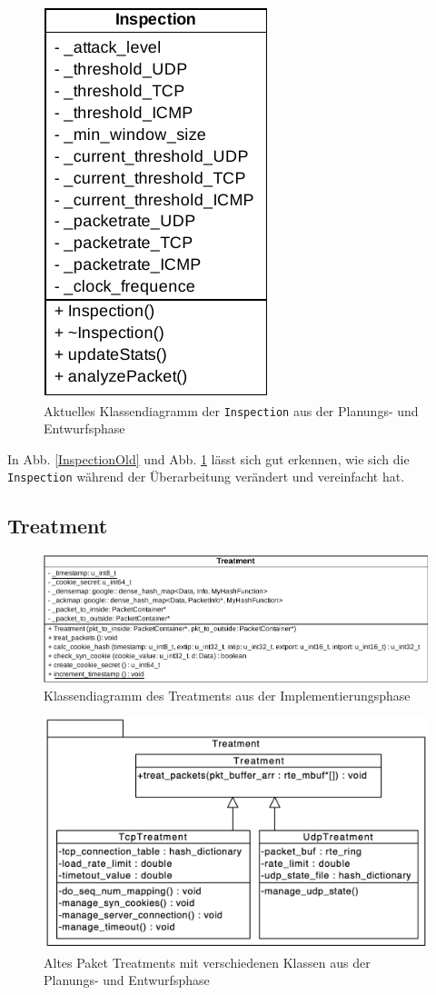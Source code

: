 \documentclass[../review_3.tex]{subfiles}
\begin{document}
\begin{figure}[h]
    \centering
    \includegraphics[width=.3\linewidth]{img/Inspection.pdf}
    \caption{Aktuelles Klassendiagramm der \texttt{Inspection} aus der Planungs- und Entwurfsphase}
    \label{InspectionNew}
\end{figure}

In Abb. \ref{InspectionOld} und Abb. \ref{InspectionNew} lässt sich gut erkennen, wie sich die \texttt{Inspection} während der Überarbeitung verändert und vereinfacht hat.

\subsection{Treatment}

\begin{figure}[h]
    \centering
    \includegraphics[width=\linewidth]{img/classdia_treatment.pdf}
    \caption{Klassendiagramm des Treatments aus der Implementierungsphase}
    \label{Treatmentclassdia}
\end{figure}

\begin{figure}[h]
    \centering
    \includegraphics[width=0.7\linewidth]{img/package_Treatment.png}
    \caption{Altes Paket Treatments mit verschiedenen Klassen aus der Planungs- und Entwurfsphase}
    \label{Treatmentclassdia2}
\end{figure}
\end{document}
